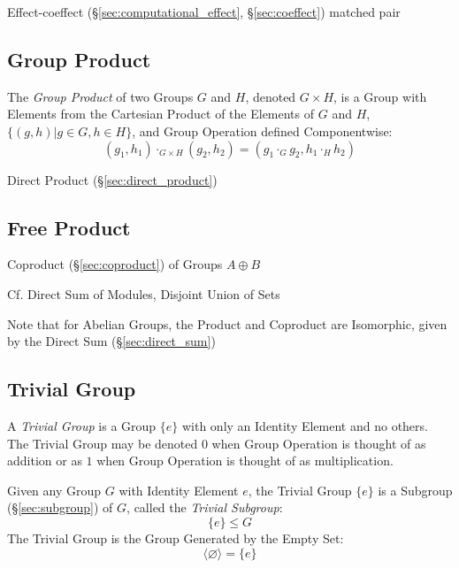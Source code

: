 Effect-coeffect (\S\ref{sec:computational_effect},
\S\ref{sec:coeffect}) matched pair



\subsection{Group Product}\label{sec:group_product}

The \emph{Group Product} of two Groups $G$ and $H$, denoted $G \times
H$, is a Group with Elements from the Cartesian Product of the
Elements of $G$ and $H$, $\{(g,h) | g \in G, h \in H\}$, and Group
Operation defined Componentwise:
\[
    (g_1, h_1) \cdot_{G \times H} (g_2, h_2)
    = (g_1 \cdot_G g_2, h_1 \cdot_H h_2)
\]

Direct Product (\S\ref{sec:direct_product})



\subsection{Free Product}\label{sec:free_product}

Coproduct (\S\ref{sec:coproduct}) of Groups $A \oplus B$

\fist Cf. Direct Sum of Modules, Disjoint Union of Sets

\fist Note that for Abelian Groups, the Product and Coproduct
are Isomorphic, given by the Direct Sum (\S\ref{sec:direct_sum})



\subsection{Trivial Group}\label{sec:trivial_group}

A \emph{Trivial Group} is a Group $\{e\}$ with only an Identity Element and no
others. The Trivial Group may be denoted $0$ when Group Operation is thought of
as addition or as $1$ when Group Operation is thought of as multiplication.

Given any Group $G$ with Identity Element $e$, the Trivial Group $\{e\}$ is a
Subgroup (\S\ref{sec:subgroup}) of $G$, called the \emph{Trivial Subgroup}:
\[
    \{e\} \leq G
\]
The Trivial Group is the Group Generated by the Empty Set:
\[
  \langle{\varnothing}\rangle = \{ e \}
\]

